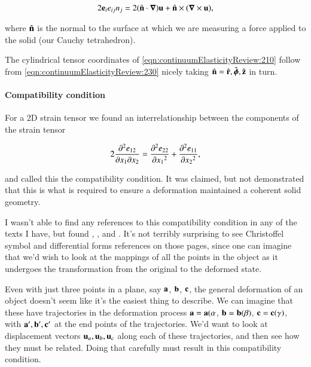 \begin{equation}\label{eqn:continuumElasticityReview:230}
2 \Be_i e_{ij} n_j = 2 (\ncap \cdot \spacegrad) \Bu + \ncap \cross (\spacegrad \cross \Bu),
\end{equation}

where $\ncap$ is the normal to the surface at which we are measuring a force applied to the solid (our Cauchy tetrahedron).

The cylindrical tensor coordinates of \ref{eqn:continuumElasticityReview:210} follow from 
\ref{eqn:continuumElasticityReview:230} nicely taking $\ncap = \rcap, \phicap, \zcap$ in turn.

\paragraph{Compatibility condition}

For a 2D strain tensor we found an interrelationship between the components of the strain tensor

\begin{equation}\label{eqn:continuumElasticityReview:510}
2 \frac{\partial^2 e_{12}}{\partial x_1 \partial x_2} 
=
\PDSq{x_1}{e_{22}} 
+\PDSq{x_2}{e_{11}},
\end{equation}

and called this the compatibility condition.  It was claimed, but not demonstrated that this is what is required to ensure a deformation maintained a coherent solid geometry.

I wasn't able to find any references to this compatibility condition in any of the texts I have, but found \cite{wiki:compatibilityMechanics}, \cite{wiki:infinitesimalStrainTheory}, and \cite{wiki:saintVenantCompat}.  It's not terribly surprising to see Christoffel symbol and differential forms references on those pages, since one can imagine that we'd wish to look at the mappings of all the points in the object as it undergoes the transformation from the original to the deformed state.

Even with just three points in a plane, say $\Ba$, $\Bb$, $\Bc$, the general deformation of an object doesn't seem like it's the easiest thing to describe.  We can imagine that these have trajectories in the deformation process $\Ba = \Ba(\alpha$, $\Bb = \Bb(\beta)$, $\Bc = \Bc(\gamma)$, with $\Ba', \Bb', \Bc'$ at the end points of the trajectories.  We'd want to look at displacement vectors $\Bu_a, \Bu_b, \Bu_c$ along each of these trajectories, and then see how they must be related.  Doing that carefully must result in this compatibility condition.

